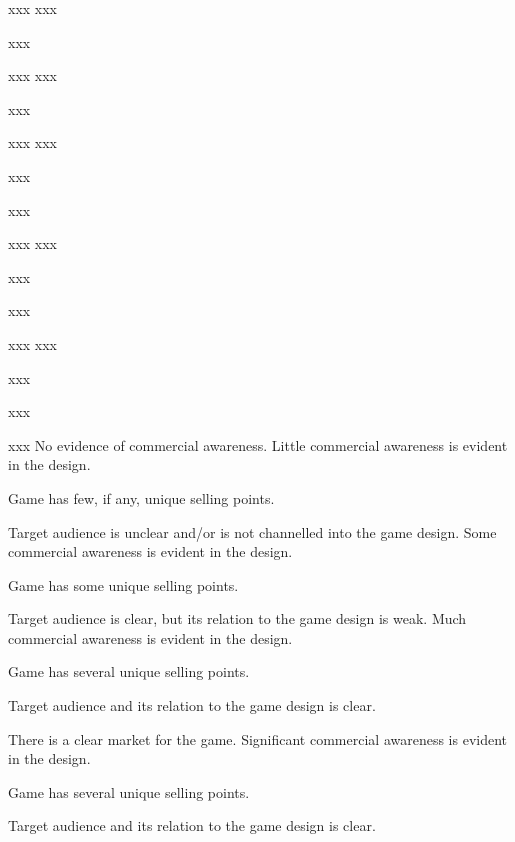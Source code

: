 \documentclass{../fal_assignment}
\begin{document}
\begin{markingrubric}
%
        \grade\fail xxx
        \grade xxx
            \par xxx
            \par xxx
        \grade xxx
            \par xxx
            \par xxx
        \grade xxx
            \par xxx
            \par xxx
            \par xxx
        \grade xxx
            \par xxx
            \par xxx
            \par xxx
        \grade xxx
            \par xxx
            \par xxx
            \par xxx
%
        \grade\fail No evidence of commercial awareness.
        \grade Little commercial awareness is evident in the design.
            \par Game has few, if any, unique selling points.
            \par Target audience is unclear and/or is not channelled into the game design.
        \grade Some commercial awareness is evident in the design.
            \par Game has some unique selling points.
            \par Target audience is clear, but its relation to the game design is weak.
        \grade Much commercial awareness is evident in the design.
            \par Game has several unique selling points.
            \par Target audience and its relation to the game design is clear.
            \par There is a clear market for the game.
        \grade Significant commercial awareness is evident in the design.
            \par Game has several unique selling points.
            \par Target audience and its relation to the game design is clear.

\end{markingrubric}
\end{document}
